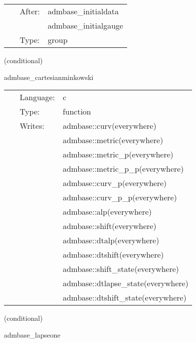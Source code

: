 \documentclass{article}
\begin{document}
\hspace{5mm}

 \begin{tabular*}{160mm}{cll} 
~ & After:  & admbase\_initialdata \\ 
~& ~ &admbase\_initialgauge\\ 
~ & Type:  & group \\ 
\end{tabular*} 


\vspace{5mm}

   (conditional) 

\hspace{5mm} admbase\_cartesianminkowski 

\hspace{5mm}{\it set the metric and extrinsic curvature to cartesian minkowski values } 


\hspace{5mm}

 \begin{tabular*}{160mm}{cll} 
~ & Language:  & c \\ 
~ & Type:  & function \\ 
~ & Writes:  & admbase::curv(everywhere) \\ 
~& ~ &admbase::metric(everywhere)\\ 
~& ~ &admbase::metric\_p(everywhere)\\ 
~& ~ &admbase::metric\_p\_p(everywhere)\\ 
~& ~ &admbase::curv\_p(everywhere)\\ 
~& ~ &admbase::curv\_p\_p(everywhere)\\ 
~& ~ &admbase::alp(everywhere)\\ 
~& ~ &admbase::shift(everywhere)\\ 
~& ~ &admbase::dtalp(everywhere)\\ 
~& ~ &admbase::dtshift(everywhere)\\ 
~& ~ &admbase::shift\_state(everywhere)\\ 
~& ~ &admbase::dtlapse\_state(everywhere)\\ 
~& ~ &admbase::dtshift\_state(everywhere)\\ 
\end{tabular*} 


\vspace{5mm}

   (conditional) 

\hspace{5mm} admbase\_lapseone 
\end{document}
